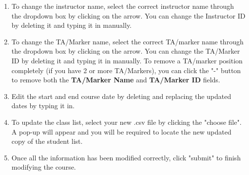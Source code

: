 \documentclass{article}
\begin{document}
\begin{enumerate}
\begin{center}
   \end{center}
   \begin{enumerate}
   \item To change the instructor name, select the correct instructor name
     through the dropdown box by clicking on the arrow. You can change the
     Instructor ID by deleting it and typing it in manually.
   \item To change the TA/Marker name, select the correct TA/marker name
     through the dropdown box by clicking on the arrow. You can change the
     TA/Marker ID by deleting it and typing it in manually. To remove a
     TA/marker position completely (if you have 2 or more TA/Markers), you can
     click the "-" button to remove both the \textbf{TA/Marker Name} and
     \textbf{TA/Marker ID} fields.
   \item Edit the start and end course date by deleting and replacing the
     updated dates by typing it in.
   \item To update the class list, select your new .csv file by clicking the
     "choose file". A pop-up will appear and you will be required to locate
     the new updated copy of the student list.
   \item Once all the information has been modified correctly, click "submit"
     to finish modifying the course.
   \end{enumerate}
\end{enumerate}
\end{document}
